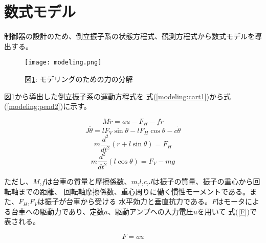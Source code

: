 \documentclass[a4j,11pt,twoside]{jbook}
\begin{document}
\section{数式モデル}
制御器の設計のため、倒立振子系の状態方程式、観測方程式から数式モデルを導出する。
\begin{figure}[htbp]
    \begin{center}
        \texttt{[image: modeling.png]}
        \caption{図\ref{modeling}: モデリングのための力の分解}
        \label{modeling}
    \end{center}
\end{figure}

図\ref{modeling}から導出した倒立振子系の運動方程式を
式(\ref{modeling:cart1})から式(\ref{modeling:pend2})に示す。

\begin{equation}
    M \ddot r = au - F_{H} - f \dot r
    \label{modeling:cart1}
\end{equation}
\begin{equation}
    J \ddot \theta = lF_{V}\sin \theta - lF_{H}\cos \theta - c \dot \theta
    \label{modeling:pend1}
\end{equation}
\begin{equation}
    m\frac{d^2}{dt^2}(r + l\sin \theta) = F_{H}
    \label{modeling:cart2}
\end{equation}
\begin{equation}
    m\frac{d^2}{dt^2}(l\cos \theta) = F_{V} - mg
    \label{modeling:pend2}
\end{equation}

ただし、$M$,$f$は台車の質量と摩擦係数、$m$,$l$,$c$,$J$は振子の質量、振子の重心から回転軸までの距離、
回転軸摩擦係数、重心周りに働く慣性モーメントである。また、$F_{H}$,$F_{V}$は振子が台車から受ける
水平効力と垂直抗力である。$F$はモータによる台車への駆動力であり、定数$a$、駆動アンプへの入力電圧$u$を用いて
式(\ref{F})で表される。

\begin{equation}
    F = au
    \label{F}
\end{equation}
\end{document}
